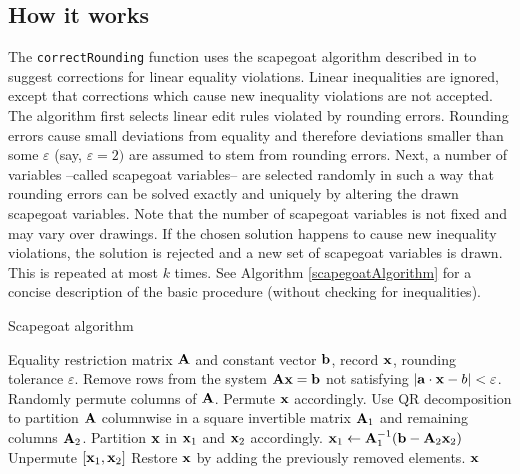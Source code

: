 \documentclass[11pt, fleqn, a4paper]{article}
\begin{document}
\subsection{How it works}
The {\tt correctRounding} function uses the scapegoat algorithm described in
\cite{scholtus:2008} to suggest corrections for linear equality violations.
Linear inequalities are ignored, except that corrections which cause new
inequality violations are not accepted.  The algorithm first selects linear edit
rules violated by rounding errors. Rounding errors cause small deviations from
equality and therefore deviations smaller than some $\varepsilon$ (say,
$\varepsilon=2)$ are assumed to stem from rounding errors.  Next, a number of
variables --called scapegoat variables-- are selected randomly in such a way
that rounding errors can be solved exactly and uniquely by altering the drawn
scapegoat variables. Note that the number of scapegoat variables is not fixed
and may vary over drawings. If the chosen solution happens to cause new
inequality violations, the solution is rejected and a new set of scapegoat
variables is drawn. This is repeated at most $k$ times.  See Algorithm
\ref{scapegoatAlgorithm} for a concise description of the basic procedure
(without checking for inequalities).
%
%
\begin{algorithm}[t]
\caption{Scapegoat algorithm}
\label{scapegoatAlgorithm}
\begin{algorithmic}[1]
\Require Equality restriction matrix $\bf A$ and constant vector $\bf b$, record $\bf x$,
    rounding tolerance $\varepsilon$. 
\State Remove rows from the system  $\bf Ax=b$ not satisfying $|{\bf a}\cdot{\bf x}-b|<\varepsilon$. 
\State Randomly permute columns of $\bf A$. Permute $\bf x$ accordingly.
\State Use QR decomposition to partition $\bf A$ columnwise in a square invertible
    matrix ${\bf A}_1$ and remaining columns ${\bf A}_2$.  Partition $\bf x$ in ${\bf x}_1$ and ${\bf x}_2$ accordingly.
\State ${\bf x}_1\leftarrow {\bf A}_1^{-1}({\bf b}-{\bf A}_2{\bf x}_2)$
\State Unpermute $[{\bf x}_1,{\bf x}_2]$
\EndIf
\State Restore $\bf x$ by adding the previously removed elements.
\Ensure ${\bf x}$
\end{algorithmic}
\end{algorithm}
%
%

%
%
\end{document}
